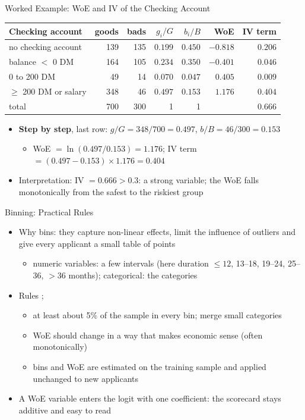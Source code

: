 \begin{frame}{Worked Example: WoE and IV of the Checking Account}
\itemsize{\footnotesize}
\begin{center}
\scriptsize
\begin{tabular}{lrrrrrr}
\toprule
Checking account & goods & bads & $g_i/G$ & $b_i/B$ & WoE & IV term \\
\midrule
no checking account & 139 & 135 & $0.199$ & $0.450$ & $-0.818$ & $0.206$ \\
balance $<$ 0 DM & 164 & 105 & $0.234$ & $0.350$ & $-0.401$ & $0.046$ \\
0 to 200 DM & 49 & 14 & $0.070$ & $0.047$ & $0.405$ & $0.009$ \\
$\ge$ 200 DM or salary & 348 & 46 & $0.497$ & $0.153$ & $1.176$ & $0.404$ \\
total & 700 & 300 & 1 & 1 & & $0.666$ \\
\bottomrule
\end{tabular}
\end{center}
\begin{itemize}
    \item \textbf{Step by step}, last row: $g/G = 348/700 = 0.497$, $b/B = 46/300 = 0.153$
    \begin{itemize}
        \item WoE $= \ln(0.497/0.153) = 1.176$; IV term $= (0.497 - 0.153) \times 1.176 = 0.404$
    \end{itemize}
    \item Interpretation: IV $= 0.666 > 0.3$: a strong variable; the WoE falls monotonically from the safest to the riskiest group
\end{itemize}
\end{frame}

\begin{frame}{Binning: Practical Rules}
\itemsize{\small}
\begin{itemize}
    \item Why bins: they capture non-linear effects, limit the influence of outliers and give every applicant a small table of points
    \begin{itemize}
        \item numeric variables: a few intervals (here duration $\le 12$, 13--18, 19--24, 25--36, $> 36$ months); categorical: the categories
    \end{itemize}
    \item Rules ; 
    \begin{itemize}
        \item at least about 5\% of the sample in every bin; merge small categories
        \item WoE should change in a way that makes economic sense (often monotonically)
        \item bins and WoE are estimated on the training sample and applied unchanged to new applicants
    \end{itemize}
    \item A WoE variable enters the logit with one coefficient: the scorecard stays additive and easy to read
\end{itemize}
\end{frame}

